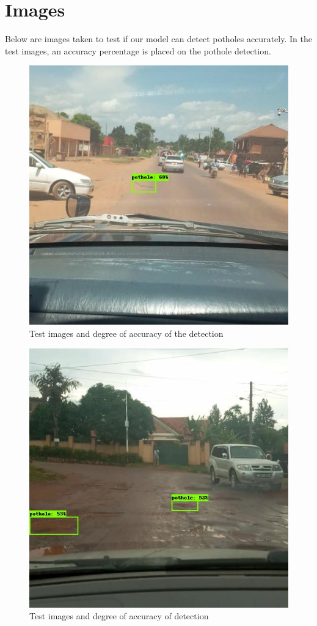 \documentclass[12pt]{report}
\begin{document}
\section{Images}
Below are images taken to test if our model can detect potholes accurately. In the test images, an accuracy percentage is placed on the pothole detection.
\begin{figure}[H]\includegraphics[scale=0.6]{1.jpg}\centering\caption{Test images and degree of accuracy of the detection} \label{fig:Test Images} \end{figure}%
\begin{figure}[H]\includegraphics[scale=0.6]{2.jpg}\centering\caption{Test images and degree of accuracy of detection} \label{fig:Test Images} \end{figure}%
\end{document}
